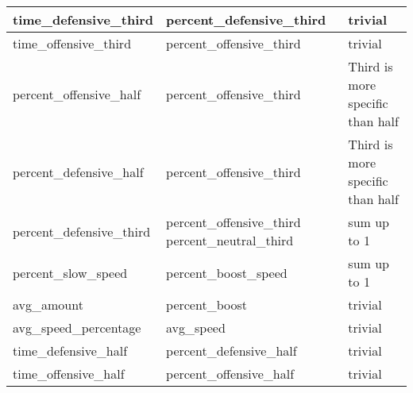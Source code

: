 \begin{table}[]
\begin{tabular}{|l|l|l|}
    time\_defensive\_third     & percent\_defensive\_third                           & trivial                                                                                                                    \\ \hline
    time\_offensive\_third     & percent\_offensive\_third                           & trivial                                                                                                                    \\ \hline
    percent\_offensive\_half   & percent\_offensive\_third                           & Third is more specific than half                                                                                           \\ \hline
    percent\_defensive\_half   & percent\_offensive\_third                           & Third is more specific than half                                                                                           \\ \hline
    percent\_defensive\_third  & percent\_offensive\_third   percent\_neutral\_third & sum up to 1                                                                                                                \\ \hline
    percent\_slow\_speed       & percent\_boost\_speed                               & sum up to 1                                                                                                                \\ \hline
    avg\_amount                & percent\_boost                                      & trivial                                                                                                                    \\ \hline
    avg\_speed\_percentage     & avg\_speed                                          & trivial                                                                                                                    \\ \hline
    time\_defensive\_half      & percent\_defensive\_half                            & trivial                                                                                                                    \\ \hline
    time\_offensive\_half      & percent\_offensive\_half                            & trivial                                                                                                                    \\ \hline

\end{tabular}
\end{table}

